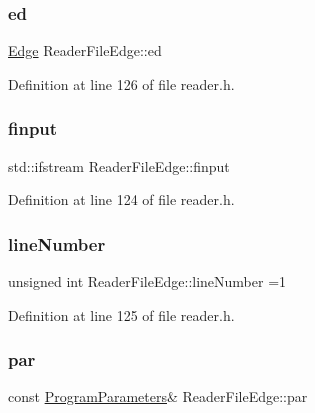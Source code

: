 \subsubsection{\texorpdfstring{ed}{ed}}
{\footnotesize\ttfamily \hyperlink{classEdge}{Edge} Reader\+File\+Edge\+::ed\hspace{0.3cm}{\ttfamily [private]}}



Definition at line 126 of file reader.\+h.

\mbox{\label{classReaderFileEdge_a8ccb004737f00ed157d72d59bf005136}} 
\subsubsection{\texorpdfstring{finput}{finput}}
{\footnotesize\ttfamily std\+::ifstream Reader\+File\+Edge\+::finput\hspace{0.3cm}{\ttfamily [private]}}



Definition at line 124 of file reader.\+h.

\mbox{\label{classReaderFileEdge_a18237693728b8b807c7ed035f80f96ca}} 
\subsubsection{\texorpdfstring{line\+Number}{lineNumber}}
{\footnotesize\ttfamily unsigned int Reader\+File\+Edge\+::line\+Number =1\hspace{0.3cm}{\ttfamily [private]}}



Definition at line 125 of file reader.\+h.

\mbox{\label{classReaderFileEdge_a9a956337d362be53e70c6fdbe827b818}} 
\subsubsection{\texorpdfstring{par}{par}}
{\footnotesize\ttfamily const \hyperlink{structProgramParameters}{Program\+Parameters}\& Reader\+File\+Edge\+::par\hspace{0.3cm}{\ttfamily [private]}}



